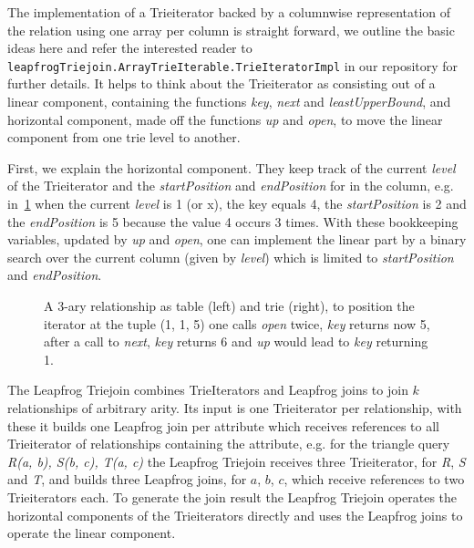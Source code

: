 The implementation of a Trieiterator backed by a columnwise representation of the relation using one array
per column is straight forward, we outline the basic ideas here and refer the interested reader to
\texttt{leapfrogTriejoin.ArrayTrieIterable.TrieIteratorImpl} in our repository for further details.  %
It helps to think about the Trieiterator as consisting out of a linear component, containing the functions
\textit{key}, \textit{next} and \textit{leastUpperBound}, and horizontal component, made off the functions \textit{up} and \textit{open},
to move the linear component from one trie level to another.

First, we explain the horizontal component.
They keep track of the current \textit{level} of the Trieiterator and the \textit{startPosition} and \textit{endPosition}
for in the column, e.g. in~\cref{fig:trie-example} when the current \textit{level} is 1 (or x), the key equals 4, the
\textit{startPosition} is 2 and
the \textit{endPosition} is 5 because the value 4 occurs 3 times.
With these bookkeeping variables, updated by \textit{up} and \textit{open}, one can implement the linear part by
a binary search over the current column (given by \textit{level}) which is limited to \textit{startPosition} and \textit{endPosition}.

\begin{figure}
    \centering
    
    \caption{A 3-ary relationship as table (left) and trie (right), to position the iterator at the tuple (1, 1, 5) one
    calls \textit{open} twice, \textit{key} returns now 5, after a call to \textit{next}, \textit{key} returns 6 and \textit{up}
    would lead to \textit{key} returning 1.}
    \label{fig:trie-example}
\end{figure}

The Leapfrog Triejoin combines TrieIterators and Leapfrog joins to join $k$ relationships of arbitrary arity.
Its input is one Trieiterator per relationship, with these it builds one Leapfrog join per attribute which
receives references to all Trieiterator of relationships containing the attribute, e.g. for the triangle query
\textit{R(a, b), S(b, c), T(a, c)} the Leapfrog Triejoin receives three Trieiterator, for \textit{R}, \textit{S} and
\textit{T},
and builds three Leapfrog joins, for $a$, $b$, $c$, which receive references to two Trieiterators each.
To generate the join result the Leapfrog Triejoin operates the horizontal components of the Trieiterators directly and
uses the Leapfrog joins to operate the linear component.

